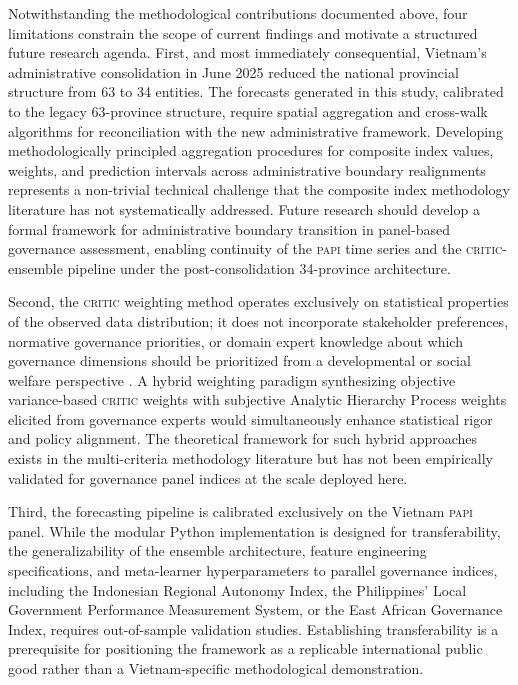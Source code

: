 \documentclass[12pt,a4paper]{article}
\newcommand{\PAPI}{\textsc{papi}\xspace}
\newcommand{\CRITIC}{\textsc{critic}\xspace}
\begin{document}
Notwithstanding the methodological contributions documented above, four limitations constrain the scope of current findings and motivate a structured future research agenda. First, and most immediately consequential, Vietnam's administrative consolidation in June 2025 reduced the national provincial structure from 63 to 34 entities. The forecasts generated in this study, calibrated to the legacy 63-province structure, require spatial aggregation and cross-walk algorithms for reconciliation with the new administrative framework. Developing methodologically principled aggregation procedures for composite index values, weights, and prediction intervals across administrative boundary realignments represents a non-trivial technical challenge that the composite index methodology literature has not systematically addressed. Future research should develop a formal framework for administrative boundary transition in panel-based governance assessment, enabling continuity of the \PAPI time series and the \CRITIC-ensemble pipeline under the post-consolidation 34-province architecture.

Second, the \CRITIC weighting method operates exclusively on statistical properties of the observed data distribution; it does not incorporate stakeholder preferences, normative governance priorities, or domain expert knowledge about which governance dimensions should be prioritized from a developmental or social welfare perspective \citep{Greco2018}. A hybrid weighting paradigm synthesizing objective variance-based \CRITIC weights with subjective Analytic Hierarchy Process weights elicited from governance experts would simultaneously enhance statistical rigor and policy alignment. The theoretical framework for such hybrid approaches exists in the multi-criteria methodology literature but has not been empirically validated for governance panel indices at the scale deployed here.

Third, the forecasting pipeline is calibrated exclusively on the Vietnam \PAPI panel. While the modular Python implementation is designed for transferability, the generalizability of the ensemble architecture, feature engineering specifications, and meta-learner hyperparameters to parallel governance indices, including the Indonesian Regional Autonomy Index, the Philippines' Local Government Performance Measurement System, or the East African Governance Index, requires out-of-sample validation studies. Establishing transferability is a prerequisite for positioning the framework as a replicable international public good rather than a Vietnam-specific methodological demonstration.
\end{document}
